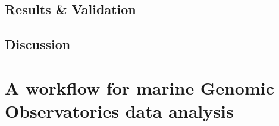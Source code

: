 \subsection{Results \& Validation}

\subsection{Discussion}











\section{A workflow for marine Genomic Observatories data analysis}






